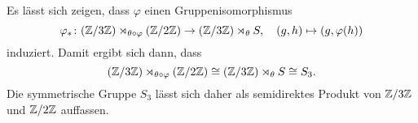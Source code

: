 \begin{bsp}
\begin{enumerate}[leftmargin=*]
\begin{bem}
   Es lässt sich zeigen, dass $\varphi$ einen Gruppenisomorphismus
   \[
    \varphi_*
    \colon
    (\mathbb{Z}/3\mathbb{Z}) \rtimes_{\theta \circ \varphi} (\mathbb{Z}/2\mathbb{Z})
    \to
    (\mathbb{Z}/3\mathbb{Z}) \rtimes_\theta S,
    \quad
    (g,h) \mapsto (g,\varphi(h))
   \]
   induziert. Damit ergibt sich dann, dass
   \[
    (\mathbb{Z}/3\mathbb{Z}) \rtimes_{\theta \circ \varphi} (\mathbb{Z}/2\mathbb{Z})
    \cong
    (\mathbb{Z}/3\mathbb{Z}) \rtimes_\theta S
    \cong
    S_3.
   \]
   Die symmetrische Gruppe $S_3$ lässt sich daher als semidirektes Produkt von $\mathbb{Z}/3\mathbb{Z}$ und $\mathbb{Z}/2\mathbb{Z}$ auffassen.
  \end{bem}
 \end{enumerate}
\end{bsp}







































